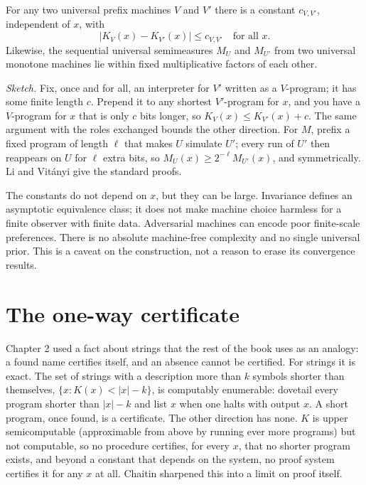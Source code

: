 \begin{theorem}[Invariance]
For any two universal prefix machines $V$ and $V'$ there is a constant $c_{V,V'}$, independent of $x$, with
$$|K_V(x) - K_{V'}(x)| \le c_{V,V'} \quad \text{for all } x.$$
Likewise, the sequential universal semimeasures $M_U$ and $M_{U'}$ from two universal monotone machines lie within fixed multiplicative factors of each other.
\end{theorem}

\emph{Sketch.} Fix, once and for all, an interpreter for $V'$ written as a $V$-program; it has some finite length $c$. Prepend it to any shortest $V'$-program for $x$, and you have a $V$-program for $x$ that is only $c$ bits longer, so $K_V(x) \le K_{V'}(x) + c$. The same argument with the roles exchanged bounds the other direction. For $M$, prefix a fixed program of length $\ell$ that makes $U$ simulate $U'$; every run of $U'$ then reappears on $U$ for $\ell$ extra bits, so $M_U(x) \ge 2^{-\ell} M_{U'}(x)$, and symmetrically. Li and Vit\'anyi give the standard proofs.

The constants do not depend on $x$, but they can be large. Invariance defines an asymptotic equivalence class; it does not make machine choice harmless for a finite observer with finite data. Adversarial machines can encode poor finite-scale preferences. There is no absolute machine-free complexity and no single universal prior. This is a caveat on the construction, not a reason to erase its convergence results.

\section*{The one-way certificate}

Chapter 2 used a fact about strings that the rest of the book uses as an analogy: a found name certifies itself, and an absence cannot be certified. For strings it is exact. The set of strings with a description more than $k$ symbols shorter than themselves, $\{x : K(x) < |x| - k\}$, is computably enumerable: dovetail every program shorter than $|x| - k$ and list $x$ when one halts with output $x$. A short program, once found, is a certificate. The other direction has none. $K$ is upper semicomputable (approximable from above by running ever more programs) but not computable, so no procedure certifies, for every $x$, that no shorter program exists, and beyond a constant that depends on the system, no proof system certifies it for any $x$ at all. Chaitin sharpened this into a limit on proof itself.

